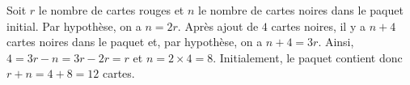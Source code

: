 Soit $r$ le nombre de cartes rouges et $n$ le nombre de cartes noires dans le paquet initial. Par hypothèse, on a $n=2r$. Après ajout de $4$ cartes noires, il y a $n+4$ cartes noires dans le paquet et, par hypothèse, on a $n+4=3r$. Ainsi, $4=3r-n=3r-2r=r$ et $n=2\times 4=8$. Initialement, le paquet contient donc $r+n=4+8=12$ cartes.